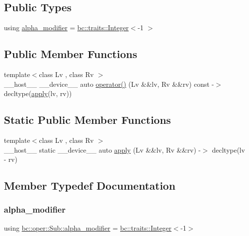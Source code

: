 \subsection*{Public Types}
\begin{DoxyCompactItemize}
\item 
using \hyperlink{structbc_1_1oper_1_1Sub_a0aba9498278750a92b9d88b2b51a465a}{alpha\+\_\+modifier} = \hyperlink{structbc_1_1traits_1_1Integer}{bc\+::traits\+::\+Integer}$<$-\/1 $>$
\end{DoxyCompactItemize}
\subsection*{Public Member Functions}
\begin{DoxyCompactItemize}
\item 
{\footnotesize template$<$class Lv , class Rv $>$ }\\\+\_\+\+\_\+host\+\_\+\+\_\+ \+\_\+\+\_\+device\+\_\+\+\_\+ auto \hyperlink{structbc_1_1oper_1_1Sub_af0f4415db3edd52cc76873904980b57b}{operator()} (Lv \&\&lv, Rv \&\&rv) const -\/$>$ decltype(\hyperlink{structbc_1_1oper_1_1Sub_aea5be4cb2773cbfdb2bce202a1a05e1d}{apply}(lv, rv))
\end{DoxyCompactItemize}
\subsection*{Static Public Member Functions}
\begin{DoxyCompactItemize}
\item 
{\footnotesize template$<$class Lv , class Rv $>$ }\\\+\_\+\+\_\+host\+\_\+\+\_\+ static \+\_\+\+\_\+device\+\_\+\+\_\+ auto \hyperlink{structbc_1_1oper_1_1Sub_aea5be4cb2773cbfdb2bce202a1a05e1d}{apply} (Lv \&\&lv, Rv \&\&rv) -\/$>$ decltype(lv -\/ rv)
\end{DoxyCompactItemize}


\subsection{Member Typedef Documentation}
\mbox{\label{structbc_1_1oper_1_1Sub_a0aba9498278750a92b9d88b2b51a465a}} 
\subsubsection{\texorpdfstring{alpha\+\_\+modifier}{alpha\_modifier}}
{\footnotesize\ttfamily using \hyperlink{structbc_1_1oper_1_1Sub_a0aba9498278750a92b9d88b2b51a465a}{bc\+::oper\+::\+Sub\+::alpha\+\_\+modifier} =  \hyperlink{structbc_1_1traits_1_1Integer}{bc\+::traits\+::\+Integer}$<$-\/1$>$}



